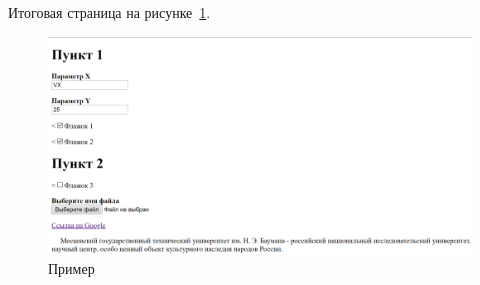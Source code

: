 Итоговая страница на рисунке~\ref{rndhpcgui.2023.02.28.picture1}.
\begin{figure}[!ht]
  \centering
  \includegraphics[scale=0.4]{ResearchNotes/rndhpc_dev_gui_2023_02_28/rndhpcgui.2023.02.28.picture1.png}
  \caption{Пример}
  \label{rndhpcgui.2023.02.28.picture1}
\end{figure}

